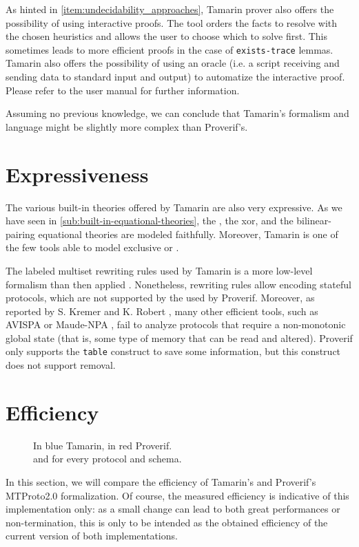 As hinted in \cref{item:undecidability_approaches}, Tamarin prover also offers the possibility of using interactive proofs. The tool orders the facts to resolve with the chosen heuristics and allows the user to choose which to solve first. This sometimes leads to more efficient proofs in the case of \lstinline{exists-trace} lemmas. Tamarin also offers the possibility of using an oracle (i.e. a script receiving and sending data to standard input and output) to automatize the interactive proof. Please refer to the user manual for further information.

Assuming no previous knowledge, we can conclude that Tamarin's formalism and language might be slightly more complex than Proverif's.

\section{Expressiveness}
The various built-in theories offered by Tamarin are also very expressive. As we have seen in \cref{sub:built-in-equational-theories}, the \DiHe{}, the xor, and the bilinear-pairing equational theories are modeled faithfully. Moreover, Tamarin is one of the few tools able to model exclusive or \cite{xor_tamarin}.

\lstset{language=proverif}
The labeled multiset rewriting rules used by Tamarin is a more low-level formalism than then applied \pic{}. Nonetheless, rewriting rules allow encoding stateful protocols, which are not supported by the \Horncs{} used by Proverif. Moreover, as reported by S. Kremer and K. Robert \cite{kremer:hal-00955869}, many other efficient tools, such as AVISPA \cite{10.1007/11513988_27} or Maude-NPA \cite{Escobar2009}, fail to analyze protocols that require a non-monotonic global state (that is, some type of memory that can be read and altered). Proverif only supports the \lstinline{table} construct to save some information, but this construct does not support removal.

\section{Efficiency}
\begin{figure}
    \centering
    \hfill
    \caption{In blue Tamarin, in red Proverif.\\\Wct{} and \mrss{} for every protocol and schema.}
    \label{fig:efficiency}
\end{figure}
In this section, we will compare the efficiency of Tamarin's and Proverif's MTProto2.0 formalization. Of course, the measured efficiency is indicative of this implementation only: as a small change can lead to both great performances or non-termination, this is only to be intended as the obtained efficiency of the current version of both implementations.

